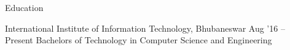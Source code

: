 \documentclass{resume} %
\begin{document}

\begin{rSection}{Education}
  \begin{rEducationSection}{International Institute of Information Technology, Bhubaneswar}
                           {Aug '16 -- Present}
                           {Bachelors of Technology in Computer Science and Engineering}
  \end{rEducationSection}
\end{rSection}
\end{document}
